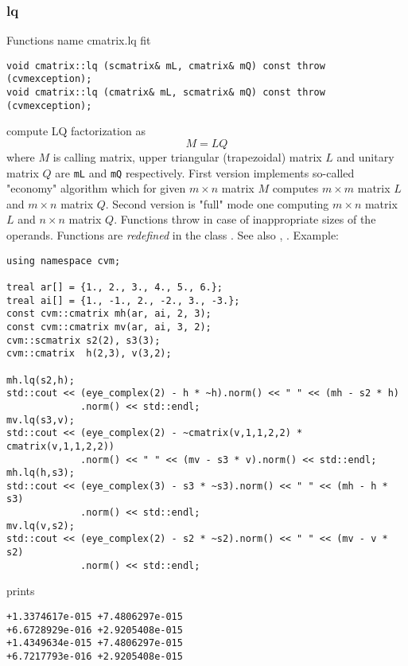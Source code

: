 \subsubsection{lq}
Functions%
\pdfdest name {cmatrix.lq} fit
\begin{verbatim}
void cmatrix::lq (scmatrix& mL, cmatrix& mQ) const throw (cvmexception);
void cmatrix::lq (cmatrix& mL, scmatrix& mQ) const throw (cvmexception);
\end{verbatim}
compute LQ factorization as
\begin{equation*}
M=LQ
\end{equation*}
where 
$M$ is  calling matrix, upper triangular (trapezoidal) matrix $L$ 
and unitary matrix $Q$ are \verb"mL" and \verb"mQ"
respectively. First version implements so-called "economy" algorithm
which for  given $m\times n$ matrix $M$ computes $m\times m$ matrix $L$
and $m\times n$ matrix $Q$. Second version is  "full" mode one 
computing $m\times n$ matrix $L$ and $n\times n$ matrix $Q$.
Functions throw
in case of inappropriate sizes of the operands.
Functions are \emph{redefined} in the class
.
See also ,
.
Example:
\begin{Verbatim}
using namespace cvm;

treal ar[] = {1., 2., 3., 4., 5., 6.};
treal ai[] = {1., -1., 2., -2., 3., -3.};
const cvm::cmatrix mh(ar, ai, 2, 3);
const cvm::cmatrix mv(ar, ai, 3, 2);
cvm::scmatrix s2(2), s3(3);
cvm::cmatrix  h(2,3), v(3,2);

mh.lq(s2,h);
std::cout << (eye_complex(2) - h * ~h).norm() << " " << (mh - s2 * h)
             .norm() << std::endl;
mv.lq(s3,v);
std::cout << (eye_complex(2) - ~cmatrix(v,1,1,2,2) * cmatrix(v,1,1,2,2))
             .norm() << " " << (mv - s3 * v).norm() << std::endl;
mh.lq(h,s3);
std::cout << (eye_complex(3) - s3 * ~s3).norm() << " " << (mh - h * s3)
             .norm() << std::endl;
mv.lq(v,s2);
std::cout << (eye_complex(2) - s2 * ~s2).norm() << " " << (mv - v * s2)
             .norm() << std::endl;
\end{Verbatim}
prints
\begin{Verbatim}
+1.3374617e-015 +7.4806297e-015
+6.6728929e-016 +2.9205408e-015
+1.4349634e-015 +7.4806297e-015
+6.7217793e-016 +2.9205408e-015
\end{Verbatim}
\newpage



